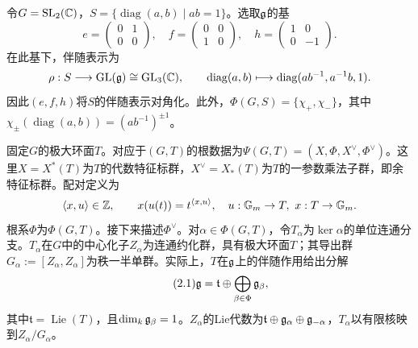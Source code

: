 \begin{example}\label{L18S2O2}
令$G=\operatorname{SL}_2(\mathbb{C})$，$S=\{\operatorname{diag}(a,b)\mid ab=1\}$。选取$\mathfrak{g}$的基
\[e=\begin{pmatrix}0&1\\0&0\end{pmatrix},\quad f=\begin{pmatrix}0&0\\1&0\end{pmatrix},\quad h=\begin{pmatrix}1&0\\0&-1\end{pmatrix}.\]
在此基下，伴随表示为
\[\rho:S\longrightarrow\operatorname{GL}(\mathfrak{g})\cong\operatorname{GL}_3(\mathbb{C}),\qquad\operatorname{diag}(a,b)\longmapsto\operatorname{diag}(ab^{-1},a^{-1}b,1).\]
因此$(e,f,h)$将$S$的伴随表示对角化。此外，$\Phi(G,S)=\{\chi_+,\chi_-\}$，其中$\chi_\pm(\operatorname{diag}(a,b))=(ab^{-1})^{\pm1}$。
\end{example}
固定$G$的极大环面$T$。对应于$(G,T)$的根数据为$\Psi(G,T)=(X,\Phi,X^\vee,\Phi^\vee)$。这里$X=X^*(T)$为$T$的代数特征标群，$X^\vee=X_*(T)$为$T$的一参数乘法子群，即余特征标群。配对定义为
\[\langle x,u\rangle\in\mathbb{Z},\qquad x(u(t))=t^{\langle x,u\rangle},\quad u:\mathbb G_m\to T,\ x:T\to\mathbb G_m.\]
根系$\Phi$为$\Phi(G,T)$。接下来描述$\Phi^\vee$。对$\alpha\in\Phi(G,T)$，令$T_\alpha$为$\ker\alpha$的单位连通分支。$T_\alpha$在$G$中的中心化子$Z_\alpha$为连通约化群，具有极大环面$T$；其导出群$G_\alpha:=[Z_\alpha,Z_\alpha]$为秩一半单群。实际上，$T$在$\mathfrak{g}$上的伴随作用给出分解
\begin{equation}\tag{2.1}\label{L18eq21}\mathfrak{g}=\mathfrak t\oplus\bigoplus_{\beta\in\Phi}\mathfrak{g}_\beta,\end{equation}
其中$\mathfrak t=\operatorname{Lie}(T)$，且$\dim_k\mathfrak{g}_\beta=1$。$Z_\alpha$的Lie代数为$\mathfrak t\oplus\mathfrak{g}_\alpha\oplus\mathfrak{g}_{-\alpha}$，$T_\alpha$以有限核映到$Z_\alpha/G_\alpha$。

